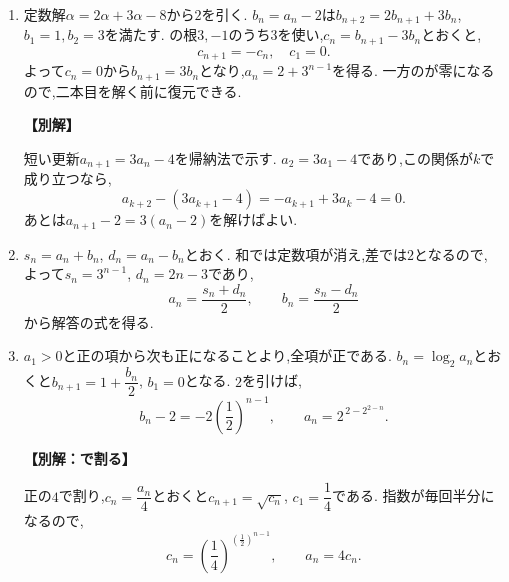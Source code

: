 \begin{enumerate}[label=\textbf{問\arabic*.},leftmargin=3.8em,format=\bookitemlink{practice-basic}{solution}{problem}]
          \item 定数解$\alpha=2\alpha+3\alpha-8$から$2$を引く.
                  $b_n=a_n-2$は$b_{n+2}=2b_{n+1}+3b_n$, $b_1=1,b_2=3$を満たす.
                  の根$3,-1$のうち$3$を使い,$c_n=b_{n+1}-3b_n$とおくと,
                  \[
                    c_{n+1}=-c_n,\quad c_1=0.
                  \]
                  よって$c_n=0$から$b_{n+1}=3b_n$となり,$a_n=2+3^{n-1}$を得る.
                  一方のが零になるので,二本目を解く前に復元できる.
                  \par\smallskip\noindent\textbf{【別解】}\par
                  短い更新$a_{n+1}=3a_n-4$を帰納法で示す.
                  $a_2=3a_1-4$であり,この関係が$k$で成り立つなら,
                  \[
                    a_{k+2}-(3a_{k+1}-4)=-a_{k+1}+3a_k-4=0.
                  \]
                  あとは$a_{n+1}-2=3(a_n-2)$を解けばよい.

          \item $s_n=a_n+b_n$, $d_n=a_n-b_n$とおく.
                  和では定数項が消え,差では$2$となるので,
                  \BookMathLayout{\[
                    s_{n+1}=3s_n,\quad d_{n+1}=d_n+2,
                    \quad s_1=1,\ d_1=-1.
                  \]}{\[
                  \begin{aligned}
                    s_{n+1}&=3s_n,\quad d_{n+1}=d_n+2,\\
                    s_1&=1,\quad d_1=-1.
                  \end{aligned}
                  \]}
                  よって$s_n=3^{n-1}$, $d_n=2n-3$であり,
                  \[
                    a_n=\frac{s_n+d_n}2,\qquad b_n=\frac{s_n-d_n}2
                  \]
                  から解答の式を得る.

          \item $a_1>0$と正の項から次も正になることより,全項が正である.
                  $b_n=\log_2a_n$とおくと$b_{n+1}=1+\dfrac{b_n}{2}$, $b_1=0$となる.
                  $2$を引けば,
                  \[
                    b_n-2=-2\left(\frac12\right)^{n-1},
                    \qquad a_n=2^{\,2-2^{2-n}}.
                  \]
                  \par\smallskip\noindent\textbf{【別解：で割る】}\par
                  正の$4$で割り,$c_n=\dfrac{a_n}{4}$とおくと$c_{n+1}=\sqrt{c_n}$, $c_1=\dfrac{1}{4}$である.
                  指数が毎回半分になるので,
                  \[
                    c_n=\left(\frac14\right)^{(\frac12)^{n-1}},
                    \qquad a_n=4c_n.
                  \]


\end{enumerate}
